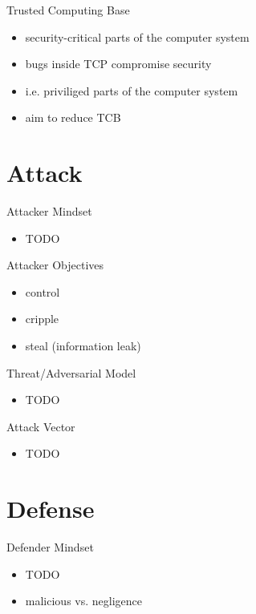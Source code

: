 \documentclass{curs}
\begin{document}
\begin{frame}{Trusted Computing Base}
  \begin{itemize}
    \item security-critical parts of the computer system
    \item bugs inside TCP compromise security
    \item i.e. priviliged parts of the computer system
    \item aim to reduce TCB
  \end{itemize}
\end{frame}


\section{Attack}

\begin{frame}{Attacker Mindset}
  \begin{itemize}
    \item TODO
  \end{itemize}
\end{frame}

\begin{frame}{Attacker Objectives}
  \begin{itemize}
    \item control
    \item cripple
    \item steal (information leak)
  \end{itemize}
\end{frame}

\begin{frame}{Threat/Adversarial Model}
  \begin{itemize}
    \item TODO
  \end{itemize}
\end{frame}

\begin{frame}{Attack Vector}
  \begin{itemize}
    \item TODO
  \end{itemize}
\end{frame}


\section{Defense}

\begin{frame}{Defender Mindset}
  \begin{itemize}
    \item TODO
    \item malicious vs. negligence
  \end{itemize}
\end{frame}
\end{document}
